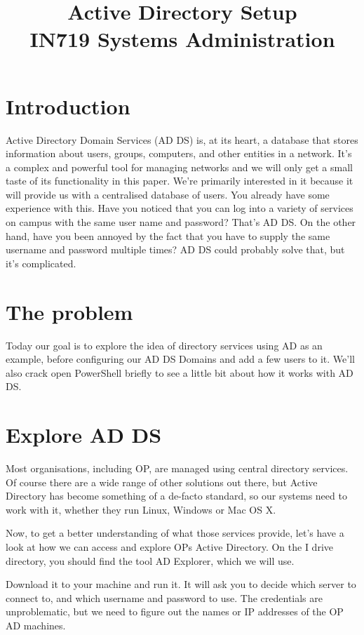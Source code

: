 \documentclass{article}
\begin{document}
\title{Active Directory Setup\\ IN719 Systems Administration}
\date{}
\maketitle

\section*{Introduction}
Active Directory Domain Services (AD DS) is, at its heart, a database that stores information about users, groups, computers, and other entities in a network. It's a complex and powerful tool for managing networks and we will only get a small taste of its functionality in this paper. We're primarily interested in it because it will provide us with a centralised database of users. You already have some experience with this. Have you noticed that you can log into a variety of services on campus with the same user name and password? That's AD DS. On the other hand, have you been annoyed by the fact that you have to supply the same username and password multiple times? AD DS could probably solve that, but it's complicated.

\section{The problem}
Today our goal is to explore the idea of directory services using AD as an example, before configuring our AD DS Domains and add a few users to it. We'll also crack open PowerShell briefly to see a little bit about how it works with AD DS.

\section{Explore AD DS}

Most organisations, including OP, are managed using central directory services. Of course there are a wide range of other solutions out there, but Active Directory has become something of a de-facto standard, so our systems need to work with it, whether they run Linux, Windows or Mac OS X. 

Now, to get a better understanding of what those services provide, let's have a look at how we can access and explore OPs Active Directory. On the I drive directory, you should find the tool AD Explorer, which we will use.

Download it to your machine and run it. It will ask you to decide which server to connect to, and which username and password to use. The credentials are unproblematic, but we need to figure out the names or IP addresses of the OP AD machines.
\end{document}
